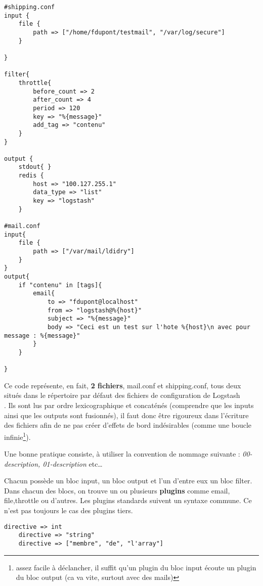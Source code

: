 \begin{lstlisting}[style=logstash,label={lst:conflogstashexample1},caption={Exemple de conf pour mail}]
#shipping.conf
input {
    file {
        path => ["/home/fdupont/testmail", "/var/log/secure"]
    }

}

filter{
    throttle{
        before_count => 2
        after_count => 4
        period => 120
        key => "%{message}"
        add_tag => "contenu"
    }
}

output {
    stdout{ }
    redis {
        host => "100.127.255.1"
        data_type => "list"
        key => "logstash"
    }

#mail.conf
input{
    file {
        path => ["/var/mail/ldidry"]
    }
}
output{
    if "contenu" in [tags]{
        email{
            to => "fdupont@localhost"
            from => "logstash@%{host}"
            subject => "%{message}"
            body => "Ceci est un test sur l'hote %{host}\n avec pour message : %{message}"
        }
    }

}
\end{lstlisting}

Ce code représente, en fait, {\bfseries 2 fichiers}, mail.conf et shipping.conf, tous
deux situés dans le répertoire par défaut des fichiers de configuration de Logstash\\
. Ils sont lus par ordre lexicographique et concaténés 
(comprendre que les inputs ainsi que les outputs sont fusionnés), il faut donc être
rigoureux dans l'écriture des fichiers afin de ne pas créer d'effets de bord indésirables
(comme une boucle infinie\footnote{assez facile à déclancher, il suffit qu'un plugin
du bloc input écoute un plugin du bloc output (ca va vite, surtout avec des mails)}).

Une bonne pratique consiste, à utiliser la convention de nommage suivante : \textit{
00-description, 01-description} etc\ldots


Chacun possède un bloc input, un bloc output et l'un d'entre eux un bloc filter.
Dans chacun des blocs, on trouve un ou plusieurs {\bfseries plugins} comme email, 
file,throttle ou d'autres. 
Les plugins standards suivent un syntaxe commune. Ce n'est pas toujours le cas des
plugins tiers. 

\begin{lstlisting}[style=logstash,label={lst:conflogstashsyntaxe1},caption={Syntaxe}]
    directive => int
    directive => "string"
    directive => ["membre", "de", "l'array"]
\end{lstlisting}

